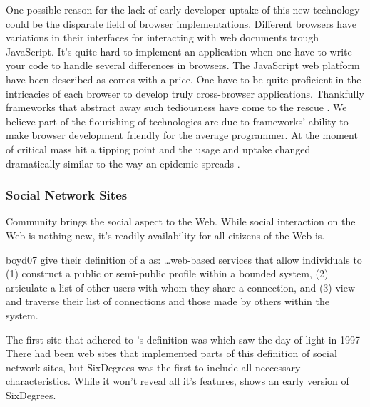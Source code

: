 One possible reason for the lack of early developer uptake of this new
technology could be the disparate field of browser implementations.
Different browsers have variations in their interfaces for interacting with
web documents trough JavaScript. It's quite hard to implement an application
when one have to write your code to handle several differences in browsers.
The JavaScript web platform have been described as
 comes with a price. One have to be quite proficient in the
intricacies of each browser to develop truly cross-browser applications.
Thankfully frameworks that abstract away such tediousness have come to
the rescue \citet[]{mesbah07}. We believe part of the flourishing of
 technologies are due to frameworks' ability to make browser
development friendly for the average programmer. At the moment of critical
mass  hit a tipping point and the usage and uptake changed
dramatically similar to the way an epidemic spreads
\citep[]{gladwell02}.

\subsubsection{Social Network Sites}
Community brings the social aspect to the Web. While social
interaction on the Web is nothing new, it's readily availability for all
citizens of the Web is.

\begin{fullquote}{boyd07}{%
  give their definition of a  as:}
    \ldots web-based services that allow individuals to (1) construct a public
    or semi-public profile within a bounded system, (2) articulate a list of
    other users with whom they share a connection, and (3) view and traverse
    their list of connections and those made by others within the system.
\end{fullquote}

The first site that adhered to \citeauthor{boyd07}'s definition was
 which saw the day of light in 1997%
There had been web sites that implemented
parts of this definition of social network sites, but SixDegrees was the
first to include all neccessary characteristics. While it won't reveal
all it's features,  shows an early
version of SixDegrees.

